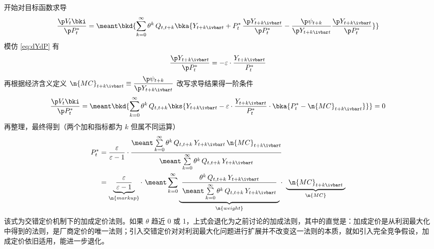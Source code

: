 开始对目标函数求导
\begin{align*}
    \dfrac{\p V_t\bki}{\p P^*_t}=\meant\bkd{\sum^\infty_{k=0}\theta^k\,Q_{t,t+k}\bka{Y_{t+k\ivbar t}+P_t^*\,\dfrac{\p Y_{t+k\ivbar t}}{\p P^*_t}-\dfrac{\p \psi_{t+k}}{\p Y_{t+k\ivbar t}}\dfrac{\p Y_{t+k\ivbar t}}{\p P^*_t}}}
\end{align*}
模仿 \ref{eq:dYdP} 有
\begin{align*}
    \dfrac{\p Y_{t+k\ivbar t}}{\p P^*_t}=-\varepsilon\cdot\dfrac{Y_{t+k\ivbar t}}{P^*_t}
\end{align*}
再根据经济含义定义 \(\n{MC}_{t+k\ivbar t}\equiv\dfrac{\p \psi_{t+k}}{\p Y_{t+k\ivbar t}}\)
改写求导结果得一阶条件
\begin{align*}
    \dfrac{\p V_t\bki}{\p P^*_t}=\meant\bkd{\sum^\infty_{k=0}\theta^k\,Q_{t,t+k}\bks{Y_{t+k\ivbar t}-\varepsilon\cdot\dfrac{Y_{t+k\ivbar t}}{P^*_t}\cdot\bka{P_t^*-\n{MC}_{t+k\ivbar t}}}}=0
\end{align*}
再整理，最终得到（两个加和指标都为 \(k\) 但属不同运算）
\begin{align}
    P_t^*&=\dfrac{\varepsilon}{\varepsilon-1}\cdot\dfrac{\meant\sum\limits^\infty_{k=0}\theta^k\,Q_{t,t+k}\,Y_{t+k\ivbar t}\,\n{MC}_{t+k\ivbar t}}{\meant\sum\limits^\infty_{k=0}\theta^k\,Q_{t,t+k}\,Y_{t+k\ivbar t}}\label{eq:staggered-markup}\\
    &=\underbrace{ \ \dfrac{\varepsilon}{\varepsilon-1} \ }_{\n{markup}}\cdot \ \meant\sum^\infty_{k=0}\underbrace{ \ \dfrac{\theta^k\,Q_{t,t+k}\,Y_{t+k\ivbar t}}{\meant\sum\limits^\infty_{k=0}\theta^k\,Q_{t,t+k}\,Y_{t+k\ivbar t}} \ }_{\n{weight}}\cdot \ \underbrace{ \ \n{MC}_{t+k\ivbar t} \ }_{\n{MC}}\notag
\end{align}
该式为交错定价机制下的加成定价法则。如果 \(\theta\) 趋近 0 或 1，上式会退化为之前讨论的加成法则，其中的直觉是：加成定价是从利润最大化中得到的法则，是厂商定价的唯一法则；引入交错定价对对利润最大化问题进行扩展并不改变这一法则的本质，就如引入完全竞争假设，加成定价依旧适用，能进一步退化。


